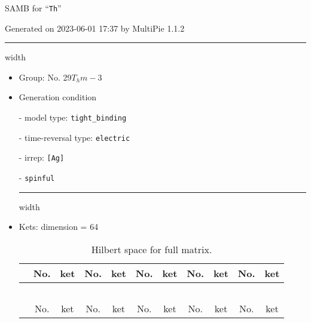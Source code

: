 \documentclass[fleqn,10pt,landscape]{article}
\begin{document}
\setcounter{MaxMatrixCols}{16}

\setlength{\baselineskip}{16pt}
\footnotesize
\begin{center}
\LARGE
SAMB for ``\texttt{Th}''
\end{center}
\begin{flushright}
Generated on 2023-06-01 17:37 by MultiPie 1.1.2
\end{flushright}
\vspace{1cm}


 \hfil \hrule height 1mm width \textwidth \hfil

\begin{itemize}
\item Group: No. 29\quad$T_{h}$\quad$m-3$\quad[ cubic ]

\vspace{5mm}

\item Generation condition

\quad - model type: \texttt{tight_binding}

\quad - time-reversal type: \texttt{electric}

\quad - irrep: \texttt{[Ag]}

\quad - \texttt{spinful}


 \hfil \hrule height 1mm width \textwidth \hfil

\item Kets: dimension = 64
\begin{center}
\renewcommand{\arraystretch}{1.3}
\begin{longtable}{c|cc|cc|cc|cc|cc}
\caption{Hilbert space for full matrix.}
 \\
 \hline \hline
 & No. & ket & No. & ket & No. & ket & No. & ket & No. & ket \\ \hline \endfirsthead

\multicolumn{10}{l}{\tablename\ \thetable{}} \\
 \hline \hline
 & No. & ket & No. & ket & No. & ket & No. & ket & No. & ket \\ \hline \endhead


\end{longtable}
\end{center}
\end{itemize}
\end{document}
